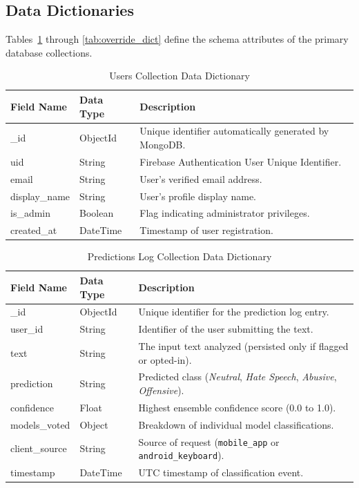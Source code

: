 \documentclass[A4paper,12pt]{report}
\theoremstyle{plain}
\theoremstyle{definition}
\theoremstyle{remark}
\numberwithin{equation}{section}
\begin{document}
\subsection{Data Dictionaries}
Tables~\ref{tab:user_dict} through \ref{tab:override_dict} define the schema attributes of the primary database collections.

\begin{table}[H]
\centering
\caption{Users Collection Data Dictionary}
\label{tab:user_dict}
\renewcommand{\arraystretch}{1.3}
\begin{tabular}{|p{3cm}|p{2.5cm}|p{8.5cm}|}
\hline
\textbf{Field Name} & \textbf{Data Type} & \textbf{Description} \\ \hline
\_id & ObjectId & Unique identifier automatically generated by MongoDB. \\ \hline
uid & String & Firebase Authentication User Unique Identifier. \\ \hline
email & String & User's verified email address. \\ \hline
display\_name & String & User's profile display name. \\ \hline
is\_admin & Boolean & Flag indicating administrator privileges. \\ \hline
created\_at & DateTime & Timestamp of user registration. \\ \hline
\end{tabular}
\end{table}

\begin{table}[H]
\centering
\caption{Predictions Log Collection Data Dictionary}
\label{tab:pred_dict}
\renewcommand{\arraystretch}{1.3}
\begin{tabular}{|p{3cm}|p{2.5cm}|p{8.5cm}|}
\hline
\textbf{Field Name} & \textbf{Data Type} & \textbf{Description} \\ \hline
\_id & ObjectId & Unique identifier for the prediction log entry. \\ \hline
user\_id & String & Identifier of the user submitting the text. \\ \hline
text & String & The input text analyzed (persisted only if flagged or opted-in). \\ \hline
prediction & String & Predicted class (\textit{Neutral}, \textit{Hate Speech}, \textit{Abusive}, \textit{Offensive}). \\ \hline
confidence & Float & Highest ensemble confidence score (0.0 to 1.0). \\ \hline
models\_voted & Object & Breakdown of individual model classifications. \\ \hline
client\_source & String & Source of request (\texttt{mobile\_app} or \texttt{android\_keyboard}). \\ \hline
timestamp & DateTime & UTC timestamp of classification event. \\ \hline
\end{tabular}
\end{table}
\end{document}
